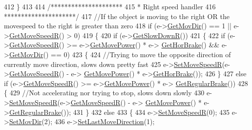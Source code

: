 \begin{DoxyCode}
412     \}
413 
414     \textcolor{comment}{/*********************}
415 \textcolor{comment}{     * Right speed handler}
416 \textcolor{comment}{     *********************/}
417     \textcolor{comment}{//If the object is moving to the right OR the movespeed to the right is greater than zero}
418     \textcolor{keywordflow}{if} (e->\hyperlink{classAI_af44b60f433e7046939fa564f17e4655f}{GetMovDir}() == 1 || e->\hyperlink{classAI_af237abb2520be87abb2fc709b23736ec}{GetMoveSpeedR}() > 0)
419     \{
420         \textcolor{keywordflow}{if} (e->\hyperlink{classAI_a144406629e0344569a28b1f02c1503ad}{GetSlowDownR}())
421         \{
422             \textcolor{keywordflow}{if} (e->\hyperlink{classAI_af237abb2520be87abb2fc709b23736ec}{GetMoveSpeedR}() >= e->\hyperlink{classAI_aa6c83658cc7028645288d90dac360ba4}{GetMovePower}() * e->
      \hyperlink{classAI_a492eb8602d131ddd7d1002a5175c677b}{GetHorBrake}() && e->\hyperlink{classAI_af44b60f433e7046939fa564f17e4655f}{GetMovDir}() == 0)
423             \{
424                 \textcolor{comment}{//Trying to move the opposite direction of currently move direction, slows down pretty fast}
425                 e->\hyperlink{classAI_a171141e877f08757696a65e3d9305660}{SetMoveSpeedR}(e->\hyperlink{classAI_af237abb2520be87abb2fc709b23736ec}{GetMoveSpeedR}() - e->
      \hyperlink{classAI_aa6c83658cc7028645288d90dac360ba4}{GetMovePower}() * e->\hyperlink{classAI_a492eb8602d131ddd7d1002a5175c677b}{GetHorBrake}());
426             \}
427             \textcolor{keywordflow}{else} \textcolor{keywordflow}{if} (e->\hyperlink{classAI_af237abb2520be87abb2fc709b23736ec}{GetMoveSpeedR}() >= e->\hyperlink{classAI_aa6c83658cc7028645288d90dac360ba4}{GetMovePower}() * e->
      \hyperlink{classAI_a12164015cfb14576341e0cd31939927a}{GetRegularBrake}())
428             \{
429                 \textcolor{comment}{//Not accelerating nor trying to stop, slows down slowly}
430                 e->\hyperlink{classAI_a171141e877f08757696a65e3d9305660}{SetMoveSpeedR}(e->\hyperlink{classAI_af237abb2520be87abb2fc709b23736ec}{GetMoveSpeedR}() - e->
      \hyperlink{classAI_aa6c83658cc7028645288d90dac360ba4}{GetMovePower}() * e->\hyperlink{classAI_a12164015cfb14576341e0cd31939927a}{GetRegularBrake}());
431             \}
432             \textcolor{keywordflow}{else}
433             \{
434                 e->\hyperlink{classAI_a171141e877f08757696a65e3d9305660}{SetMoveSpeedR}(0);
435                 e->\hyperlink{classAI_a7b1fa9a0546e462e633bbdcbbf12eb50}{SetMovDir}(2);
436                 e->\hyperlink{classAI_abc21616a023e18fe33740326b22b21fa}{SetLastMoveDirection}(1);

\end{DoxyCode}
